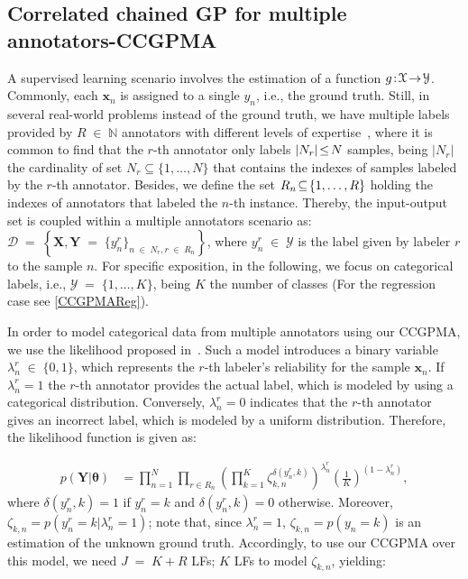 \documentclass[journal]{IEEEtran}
\providecommand{\ve}[1]{{\bm{#1}}}%
\providecommand{\mat}[1]{{\bm{#1}}} %
\DeclareMathOperator{\en}{\!\,\in\!\,}
\DeclareMathOperator{\igual}{\!\,=\!\,}
\providecommand{\s}[1]{\negthinspace#1\negthinspace}%
\providecommand{\ve}[1]{{\mathbf{#1}}}
\providecommand{\mat}[1]{{\mathbf{#1}}}
\begin{document}
\subsection{Correlated chained GP for multiple annotators-CCGPMA}

A supervised learning scenario involves the estimation of a function $g\s{:}\mathcal{X}\s{\to}\mathcal{Y}$. Commonly, each $\ve{x}_n$ is assigned to a single $y_n$, i.e., the ground truth. Still, in several real-world problems instead of the ground truth, we have multiple labels provided by $R \en\mathbb{N}$ annotators with different levels of expertise~\cite{raykar2010learning}, where it is common to find that the $r$-th annotator only labels $|N_r|\s{\le}N$ samples, being $|N_r|$ the cardinality of set $N_r\subseteq\{1,\dots , N\}$ that contains the indexes of samples labeled by the $r$-th annotator. Besides, we define the set $R_n\s{\subseteq}\{1, \dots, R\}$ holding the indexes of annotators that labeled the $n$-th instance. Thereby, the input-output set is coupled within a multiple annotators scenario as: $\mathcal{D} \igual \left\{\mat{X}, \mat{Y} \igual \{y_n^r\}_{n\en N_r,r\en R_n} \right\}$, where $y_n^r\en \mathcal{Y}$ is the label given by labeler $r$ to the sample $n$. For specific exposition, in the following, we focus on categorical labels, i.e., $\mathcal{Y}\igual\{1,\dots, K\}$, being $K$ the number of classes (For the regression case see \cref{CCGPMAReg}).

In order to model categorical data from multiple annotators using our CCGPMA, we use the likelihood proposed in~\cite{rodrigues2013learning}. Such a model introduces a binary variable $\lambda_n^r\en \{0,1\}$, which represents the $r$-th labeler's reliability for the sample $\ve{x}_n$. If $\lambda_n^r=1$ the $r$-th annotator provides the actual label, which is modeled by using a categorical distribution. Conversely, $\lambda_n^r=0$ indicates that the $r$-th annotator gives an incorrect label, which is modeled by a uniform distribution. Therefore, the likelihood function is given as:

\begin{align}
\label{eq:ClasLik}
 p(\mat{Y}|\bm{\theta}) &= \prod^N_{n=1}\prod_{r\in R_n}\left(\prod_{k=1}^{K}\zeta_{k,n}^{\delta(y_n^r,k)}\right)^{{\lambda}_n^r}\left(\frac{1}{K}\right)^{(1-{\lambda}_n^r)},
\end{align}
where $\delta(y_n^r,k)=1$ if $y_n^r=k$ and $\delta(y_n^r,k)=0$ otherwise. Moreover, $\zeta_{k,n}=p(y_n^r=k|\lambda_n^r=1)$; note that, since $\lambda_n^r=1$, $\zeta_{k,n}=p(y_n=k)$ is an estimation of the unknown ground truth. Accordingly, to use our CCGPMA over this model, we need $J\igual K+R$ LFs; $K$ LFs to model $\zeta_{k,n}$, yielding:
\end{document}
